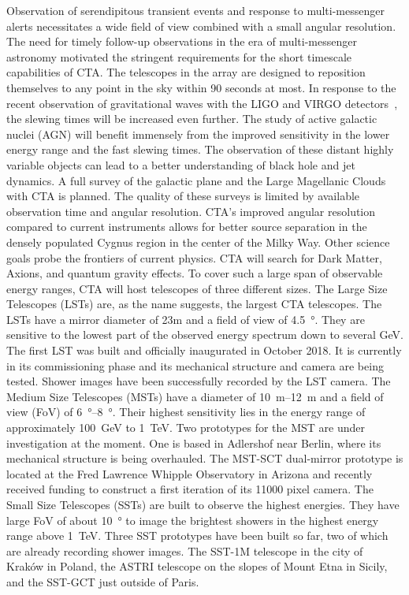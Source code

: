 Observation of serendipitous transient events and response to multi-messenger alerts necessitates a wide field of view combined with 
a small angular resolution. The need for timely follow-up observations in the era of multi-messenger astronomy motivated the 
stringent requirements for the short timescale capabilities of CTA. The telescopes in the array are designed to reposition themselves 
to any point in the sky within 90 seconds at most. 
In response to the recent observation of gravitational waves with the LIGO and VIRGO detectors~\cite{gw2015},
the slewing times will be increased even further. 
The study of active galactic nuclei (AGN) will benefit immensely from the improved sensitivity in the lower energy range and the fast slewing times.
The observation of these distant highly variable objects can lead to a better understanding of black hole and jet dynamics. 
A full survey of the galactic plane and the Large Magellanic Clouds with CTA is planned. The quality of these surveys is limited by 
available observation time and angular resolution. CTA’s improved angular resolution compared to current instruments allows for better 
source separation in the densely populated Cygnus region in the center of the Milky Way. 
Other science goals probe the frontiers of current physics. CTA will search for Dark Matter, Axions, and quantum gravity effects.
To cover such a large span of observable energy ranges, CTA will host telescopes of three different sizes.
The Large Size Telescopes (LSTs) are, as the name suggests, the largest CTA telescopes.
The LSTs have a mirror diameter of 23m and a field of view of \SI{4.5}{\degree}. They are sensitive to the lowest part of the observed energy spectrum down to several \si{GeV}.
The first LST was built and officially inaugurated in October 2018. It is currently in its commissioning phase and its
mechanical structure and camera are being tested. Shower images have been successfully recorded by the LST camera.
The Medium Size Telescopes (MSTs) have a diameter of \SIrange{10}{12}{\metre} and a field of view (FoV) of \SIrange{6}{8}{\degree}.
Their highest sensitivity lies in the energy range of approximately \SI{100}{GeV} to \SI{1}{TeV}.
Two prototypes for the MST are under investigation at the moment. One is based in Adlershof near Berlin, where its mechanical 
structure is being overhauled. The MST-SCT dual-mirror prototype is located at the Fred Lawrence Whipple Observatory in Arizona and recently received 
funding to construct a first iteration of its \num{11000} pixel camera.
The Small Size Telescopes (SSTs) are built to observe the highest energies. 
They have large FoV of about \SI{10}{\degree} to image the brightest showers in the highest energy range above \SI{1}{TeV}.
Three SST prototypes have been built so far, two of which are already recording shower images. The SST-1M telescope in the city of Kraków in Poland, the ASTRI
telescope on the slopes of Mount Etna in Sicily, and the SST-GCT just outside of Paris.

